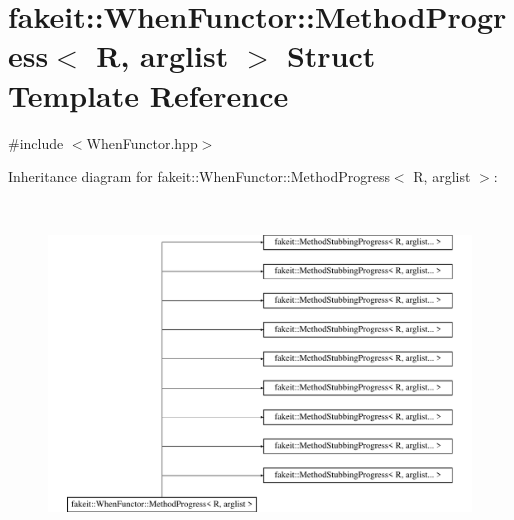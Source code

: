 \hypertarget{structfakeit_1_1WhenFunctor_1_1MethodProgress}{}\section{fakeit\+::When\+Functor\+::Method\+Progress$<$ R, arglist $>$ Struct Template Reference}
\label{structfakeit_1_1WhenFunctor_1_1MethodProgress}


{\ttfamily \#include $<$When\+Functor.\+hpp$>$}

Inheritance diagram for fakeit\+::When\+Functor\+::Method\+Progress$<$ R, arglist $>$\+:\begin{figure}[H]
\begin{center}
\leavevmode
\includegraphics[height=9.150327cm]{structfakeit_1_1WhenFunctor_1_1MethodProgress}
\end{center}
\end{figure}
